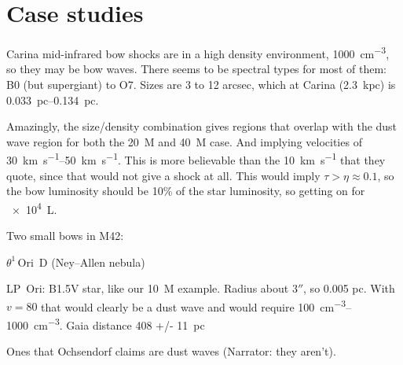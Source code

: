 \section{Case studies}
\label{sec:case-studies}

Carina mid-infrared bow shocks \citep{Sexton:2015b} are in a high
density environment, \SI{1000}{cm^{-3}}, so they may be bow waves.
There seems to be spectral types for most of them: B0 (but supergiant)
to O7.  Sizes are 3 to 12 arcsec, which at Carina (\SI{2.3}{kpc}) is
\SIrange{0.033}{0.134}{pc}.

Amazingly, the size/density combination gives regions that overlap
with the dust wave region for both the \SI{20}{M_\odot} and \SI{40}{M_\odot}
case.  And implying velocities of \SIrange{30}{50}{km.s^{-1}}.  This
is more believable than the \SI{10}{km.s^{-1}} that they quote, since
that would not give a shock at all.  This would imply
\(\tau > \eta \approx 0.1\), so the bow luminosity should be 10\% of the star
luminosity, so getting on for \SI{e4}{L_\odot}.

Two small bows in M42:

\(\theta^1\)\,Ori~D (Ney--Allen nebula) \citep{Robbertp:2005a}

LP~Ori: B1.5V star, like our \SI{10}{M_\odot} example. Radius about
\(3''\), so 0.005 pc.  With \(v = 80\) that would clearly be a dust
wave and would require \SIrange{100}{1000}{cm^{-3}}. Gaia distance \SI{408 +/- 11}{pc}


Ones that Ochsendorf claims are dust waves (Narrator: they aren't).


